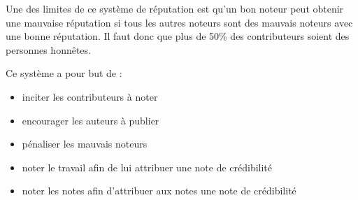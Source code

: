 \documentclass[a4paper, 11pt]{article} %
\begin{document}
Une des limites de ce système de réputation est qu'un bon noteur peut obtenir une mauvaise réputation si tous les autres noteurs sont des mauvais noteurs avec une bonne réputation. Il faut donc que plus de 50\% des contributeurs soient des personnes honnêtes.

Ce système a pour but de :
\begin{itemize}
	\item inciter les contributeurs à noter
	\item encourager les auteurs à publier
	\item pénaliser les mauvais noteurs
	\item noter le travail afin de lui attribuer une note de crédibilité
	\item noter les notes afin d'attribuer aux notes une note de crédibilité~\cite{RaterRating}
\end{itemize}
\end{document}
